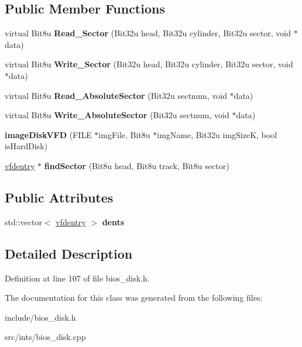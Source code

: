 \subsection*{Public Member Functions}
\begin{DoxyCompactItemize}
\item 
\hypertarget{classimageDiskVFD_a62b70cacae5003697385010ff0f40177}{virtual Bit8u {\bfseries Read\-\_\-\-Sector} (Bit32u head, Bit32u cylinder, Bit32u sector, void $\ast$data)}\label{classimageDiskVFD_a62b70cacae5003697385010ff0f40177}

\item 
\hypertarget{classimageDiskVFD_a72ab0618092979ba980cda19e326f8d7}{virtual Bit8u {\bfseries Write\-\_\-\-Sector} (Bit32u head, Bit32u cylinder, Bit32u sector, void $\ast$data)}\label{classimageDiskVFD_a72ab0618092979ba980cda19e326f8d7}

\item 
\hypertarget{classimageDiskVFD_a1bac8eb8cf34c0445b71d3966913f9cf}{virtual Bit8u {\bfseries Read\-\_\-\-Absolute\-Sector} (Bit32u sectnum, void $\ast$data)}\label{classimageDiskVFD_a1bac8eb8cf34c0445b71d3966913f9cf}

\item 
\hypertarget{classimageDiskVFD_a261457d9847ec43dbc0054e2f82e998c}{virtual Bit8u {\bfseries Write\-\_\-\-Absolute\-Sector} (Bit32u sectnum, void $\ast$data)}\label{classimageDiskVFD_a261457d9847ec43dbc0054e2f82e998c}

\item 
\hypertarget{classimageDiskVFD_a3d6b992a66cfce052569551fca9e137c}{{\bfseries image\-Disk\-V\-F\-D} (F\-I\-L\-E $\ast$img\-File, Bit8u $\ast$img\-Name, Bit32u img\-Size\-K, bool is\-Hard\-Disk)}\label{classimageDiskVFD_a3d6b992a66cfce052569551fca9e137c}

\item 
\hypertarget{classimageDiskVFD_a365454a401a7d07692d7b8ebb68e391b}{\hyperlink{structimageDiskVFD_1_1vfdentry}{vfdentry} $\ast$ {\bfseries find\-Sector} (Bit8u head, Bit8u track, Bit8u sector)}\label{classimageDiskVFD_a365454a401a7d07692d7b8ebb68e391b}

\end{DoxyCompactItemize}
\subsection*{Public Attributes}
\begin{DoxyCompactItemize}
\item 
\hypertarget{classimageDiskVFD_a9c11050c08b54c30cdb65f9c4250c856}{std\-::vector$<$ \hyperlink{structimageDiskVFD_1_1vfdentry}{vfdentry} $>$ {\bfseries dents}}\label{classimageDiskVFD_a9c11050c08b54c30cdb65f9c4250c856}

\end{DoxyCompactItemize}


\subsection{Detailed Description}


Definition at line 107 of file bios\-\_\-disk.\-h.



The documentation for this class was generated from the following files\-:\begin{DoxyCompactItemize}
\item 
include/bios\-\_\-disk.\-h\item 
src/ints/bios\-\_\-disk.\-cpp\end{DoxyCompactItemize}

